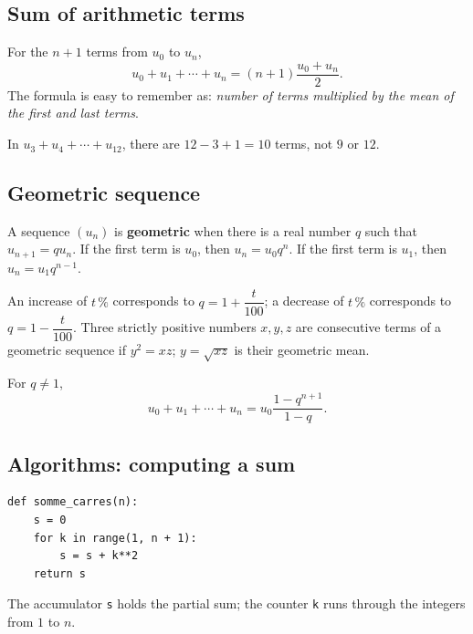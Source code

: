 \subsection{Sum of arithmetic terms}
For the $n+1$ terms from $u_0$ to $u_n$,
\[
u_0+u_1+\cdots+u_n=(n+1)\frac{u_0+u_n}{2}.
\]
The formula is easy to remember as: \emph{number of terms multiplied by the mean of the first and last terms}.

\begin{pitfall}
In $u_3+u_4+\cdots+u_{12}$, there are $12-3+1=10$ terms, not $9$ or $12$.
\end{pitfall}

\subsection{Geometric sequence}
\begin{keypoint}
A sequence $(u_n)$ is \textbf{geometric} when there is a real number $q$ such that $u_{n+1}=q u_n$. If the first term is $u_0$, then $u_n=u_0q^n$. If the first term is $u_1$, then $u_n=u_1q^{n-1}$.
\end{keypoint}

\begin{center}
\end{center}

An increase of $t\,\%$ corresponds to $q=1+\dfrac{t}{100}$; a decrease of $t\,\%$ corresponds to $q=1-\dfrac{t}{100}$. Three strictly positive numbers $x,y,z$ are consecutive terms of a geometric sequence if $y^2=xz$; $y=\sqrt{xz}$ is their geometric mean.

For $q\neq1$,
\[
u_0+u_1+\cdots+u_n=u_0\frac{1-q^{n+1}}{1-q}.
\]

\subsection{Algorithms: computing a sum}
\begin{lstlisting}[style=python]
def somme_carres(n):
    s = 0
    for k in range(1, n + 1):
        s = s + k**2
    return s
\end{lstlisting}
The accumulator \texttt{s} holds the partial sum; the counter \texttt{k} runs through the integers from $1$ to $n$.

